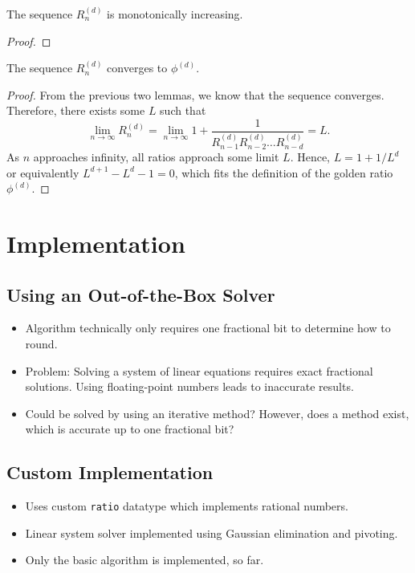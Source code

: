 \documentclass[english,version-2020-11]{uzl-thesis}
\begin{document}
\begin{lemma}
  The sequence $R^{(d)}_n$ is monotonically increasing.
\end{lemma}

\begin{proof}

\end{proof}

\begin{theorem}
  The sequence $R^{(d)}_n$ converges to $\phi^{(d)}$.
\end{theorem}

\begin{proof}
  From the previous two lemmas, we know that the sequence converges.
  Therefore, there exists some $L$ such that
  \[
    \lim_{n \to \infty} R^{(d)}_n = \lim_{n \to \infty} 1 + \frac{1}{R^{(d)}_{n-1} R^{(d)}_{n-2} \dots R^{(d)}_{n-d}} = L.
  \]
  As $n$ approaches infinity, all ratios approach some limit $L$.
  Hence, $L = 1 + 1/L^d$ or equivalently $L^{d+1} - L^d - 1 = 0$,
  which fits the definition of the golden ratio $\phi^{(d)}$.
\end{proof}

\chapter{Implementation}

\section{Using an Out-of-the-Box Solver}

\begin{itemize}
  \item Algorithm technically only requires one fractional bit to determine how to round.
  \item Problem: Solving a system of linear equations requires exact fractional solutions.
    Using floating-point numbers leads to inaccurate results.
  \item Could be solved by using an iterative method? However, does a method
    exist, which is accurate up to one fractional bit?
\end{itemize}

\section{Custom Implementation}

\begin{itemize}
  \item Uses custom \texttt{ratio} datatype which implements rational numbers.
  \item Linear system solver implemented using Gaussian elimination and pivoting.
  \item Only the basic algorithm is implemented, so far.
\end{itemize}

\begin{bibtex-entries}
\end{bibtex-entries}
\end{document}
